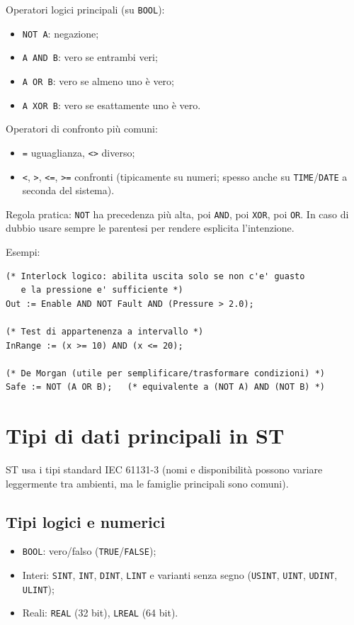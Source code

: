 Operatori logici principali (su \texttt{BOOL}):
\begin{itemize}
    \item \texttt{NOT A}: negazione;
    \item \texttt{A AND B}: vero se entrambi veri;
    \item \texttt{A OR B}: vero se almeno uno è vero;
    \item \texttt{A XOR B}: vero se esattamente uno è vero.
\end{itemize}

Operatori di confronto più comuni:
\begin{itemize}
    \item \texttt{=} uguaglianza, \texttt{<>} diverso;
    \item \texttt{<}, \texttt{>}, \texttt{<=}, \texttt{>=} confronti (tipicamente su numeri; spesso anche su \texttt{TIME}/\texttt{DATE} a seconda del sistema).
\end{itemize}

\begin{note}[Precedenza]
Regola pratica: \texttt{NOT} ha precedenza più alta, poi \texttt{AND}, poi \texttt{XOR}, poi \texttt{OR}. In caso di dubbio usare sempre le parentesi per rendere esplicita l'intenzione.
\end{note}

Esempi:
\begin{lstlisting}[basicstyle=\ttfamily\small]
(* Interlock logico: abilita uscita solo se non c'e' guasto
   e la pressione e' sufficiente *)
Out := Enable AND NOT Fault AND (Pressure > 2.0);

(* Test di appartenenza a intervallo *)
InRange := (x >= 10) AND (x <= 20);

(* De Morgan (utile per semplificare/trasformare condizioni) *)
Safe := NOT (A OR B);   (* equivalente a (NOT A) AND (NOT B) *)
\end{lstlisting}

\section{Tipi di dati principali in ST}
ST usa i tipi standard IEC 61131-3 (nomi e disponibilità possono variare leggermente tra ambienti, ma le famiglie principali sono comuni).

\subsection{Tipi logici e numerici}
\begin{itemize}
    \item \texttt{BOOL}: vero/falso (\texttt{TRUE}/\texttt{FALSE});
    \item Interi: \texttt{SINT}, \texttt{INT}, \texttt{DINT}, \texttt{LINT} e varianti senza segno (\texttt{USINT}, \texttt{UINT}, \texttt{UDINT}, \texttt{ULINT});
    \item Reali: \texttt{REAL} (32 bit), \texttt{LREAL} (64 bit).
\end{itemize}

